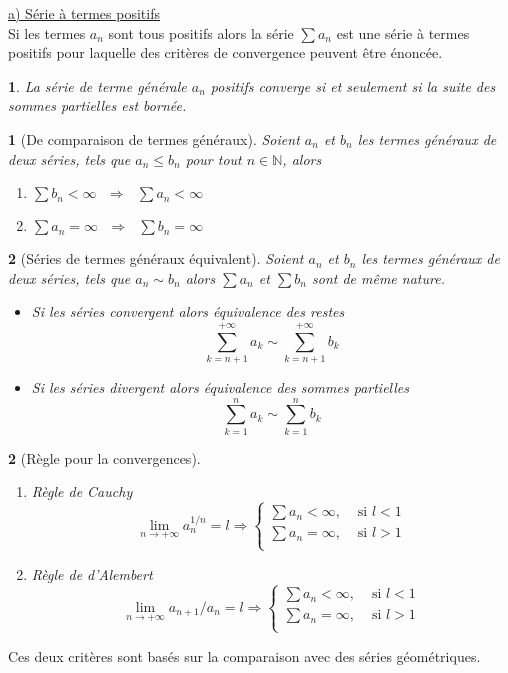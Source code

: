 \documentclass[8pt,notheorems]{beamer}
\def \N{\mathbb N}
\newtheorem{theorem}{\translate{Theorem}}[section]
\newtheorem{theorem}{\translate{Theorem}}
\newtheorem{prop}{\translate{Proposition}}
\theoremstyle{definition}
\theoremstyle{example}
\theoremstyle{mystyle}
\theoremstyle{plain}
\begin{document}
\begin{frame}[allowframebreaks]
\underline{a) Série à termes positifs}\\
Si les termes $a_n$ sont tous positifs alors la série $\sum a_n$ est une série à termes positifs pour laquelle des critères de convergence peuvent être énoncée.
\begin{prop}
La série de terme générale $a_n$ positifs converge si et seulement si la suite des sommes partielles est bornée.
\end{prop}
\begin{theorem}[De comparaison de termes généraux]
Soient $a_n$ et $b_n$ les termes généraux de deux séries, tels que $a_n\leq b_n$ pour tout $n\in\N$, alors
\begin{enumerate}
    \item $\sum b_n <\infty\text{ }\Rightarrow\text{ }\sum a_n <\infty$
    \item $\sum a_n  = \infty\text{ }\Rightarrow\text{ }\sum b_n =\infty$
\end{enumerate}
\end{theorem}
\begin{theorem}[Séries de termes généraux équivalent]
Soient $a_n$ et $b_n$ les termes généraux de deux séries, tels que $a_n\sim b_n$ alors $\sum a_n$ et $\sum b_n$ sont de même nature.
\begin{itemize}
    \item Si les séries convergent alors équivalence des restes
    $$
    \sum_{k = n+1}^{+\infty}a_k\sim \sum_{k=n+1}^{+\infty}b_k
    $$
    \item Si les séries divergent alors équivalence des sommes partielles
    $$
    \sum_{k=1}^{n}a_k\sim \sum_{k=1}^{n}b_k
    $$
\end{itemize}
\end{theorem}
\begin{prop}[Règle pour la convergences]
\begin{enumerate}
    \item Règle de Cauchy
    $$\underset{n \rightarrow +\infty}{\lim}a_n^{1/n} = l \Rightarrow\begin{cases} \sum a_n <\infty,&\text{ si }l<1\\
    \sum a_n =\infty,&\text{ si }l>1\\\end{cases}
    $$
    \item Règle de d'Alembert
    $$\underset{n \rightarrow +\infty}{\lim}a_{n+1}/a_n = l \Rightarrow\begin{cases} \sum a_n <\infty,&\text{ si }l<1\\
    \sum a_n =\infty,&\text{ si }l>1\\\end{cases}
    $$
\end{enumerate}
\end{prop}
Ces deux critères sont basés sur la comparaison avec des séries géométriques. \\
\end{frame}
\end{document}
